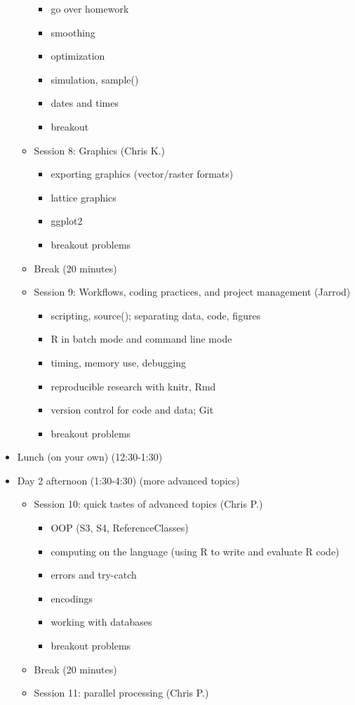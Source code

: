 \documentclass[12pt]{article}\usepackage{graphicx, color}
\begin{document}
\begin{itemize}
\begin{itemize}
\begin{itemize}
\item go over homework
\item smoothing
\item optimization
\item simulation, sample()
\item dates and times
\item breakout 
\end{itemize}
\item Session 8: Graphics (Chris K.)

\begin{itemize}
\item exporting graphics (vector/raster formats)
\item lattice graphics
\item ggplot2
\item breakout problems 
\end{itemize}
\item Break (20 minutes)
\item Session 9: Workflows, coding practices, and project management (Jarrod)

\begin{itemize}
\item scripting, source(); separating data, code, figures
\item R in batch mode and command line mode
\item timing, memory use, debugging
\item reproducible research with knitr, Rmd
\item version control for code and data; Git
\item breakout problems
\end{itemize}
\end{itemize}
\item Lunch (on your own) (12:30-1:30)
\item Day 2 afternoon (1:30-4:30) (more advanced topics) 

\begin{itemize}
\item Session 10: quick tastes of advanced topics (Chris P.)

\begin{itemize}
\item OOP (S3, S4, ReferenceClasses)
\item computing on the language (using R to write and evaluate R code)
\item errors and try-catch
\item encodings
\item working with databases
\item breakout problems
\end{itemize}
\item Break (20 minutes)
\item Session 11: parallel processing (Chris P.)


\end{itemize}
\end{itemize}
\end{document}
